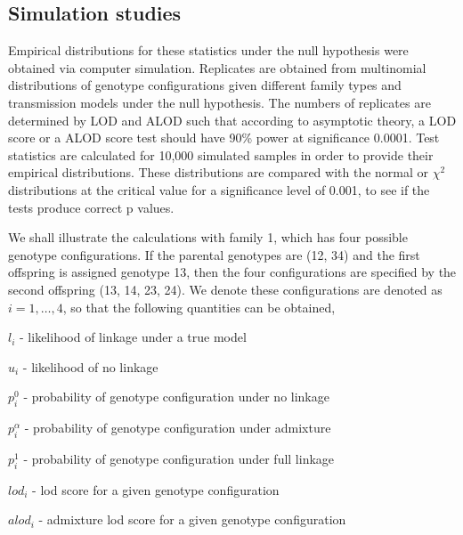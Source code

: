 \subsection*{Simulation studies}

Empirical distributions for these statistics under the null hypothesis were
obtained via computer simulation.  Replicates are obtained from multinomial
distributions of genotype configurations given different family types and
transmission models under the null hypothesis.  The numbers of replicates are
determined by LOD and ALOD such that according to asymptotic theory, a
LOD score or a ALOD score test should have 90\% power at significance 0.0001.
Test statistics are calculated for 10,000 simulated samples in order to provide
their empirical distributions.  These distributions are compared with the
normal or $\chi^2$ distributions at the critical value for a significance
level of 0.001, to see if the tests produce correct p values.


We shall illustrate the calculations with family 1, which has four possible
genotype configurations.  If the parental genotypes are (12, 34) and the first
offspring is assigned genotype 13, then the four configurations are specified
by the second offspring (13, 14, 23, 24).  We denote these configurations are
denoted as $i=1,\ldots,4$, so that the following quantities can be obtained,

$l_i$ - likelihood of linkage under a true model

$u_i$ - likelihood of no linkage

$p_i^0$ - probability of genotype configuration under no linkage

$p_i^\alpha$ - probability of genotype configuration under admixture

$p_i^1$ - probability of genotype configuration under full linkage

$lod_i$ - lod score for a given genotype configuration

$alod_i$ - admixture lod score for a given genotype configuration

